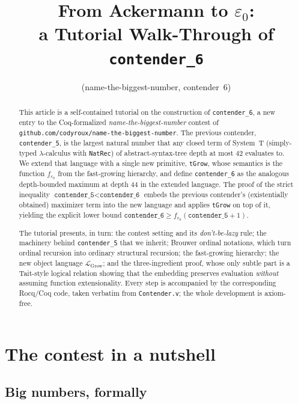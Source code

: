 \documentclass[11pt,a4paper]{article}
\title{From Ackermann to $\varepsilon_0$:\\
       a Tutorial Walk-Through of \texttt{contender\_6}}
\author{(name-the-biggest-number, contender~6)}
\date{}
\theoremstyle{plain}
\theoremstyle{definition}
\theoremstyle{remark}
\begin{document}
\maketitle
\thispagestyle{empty}

\begin{abstract}
\noindent
This article is a self-contained tutorial on the construction of
\texttt{contender\_6}, a new entry to the Coq-formalized
\emph{name-the-biggest-number} contest of
\texttt{github.com/codyroux/name-the-biggest-number}.  The previous
contender, \texttt{contender\_5}, is the largest natural number that any
closed term of System~T (simply-typed $\lambda$-calculus with
\texttt{NatRec}) of abstract-syntax-tree depth at most $42$ evaluates to.
We extend that language with a single new primitive, \texttt{tGrow},
whose semantics is the function $f_{\varepsilon_0}$ from the fast-growing
hierarchy, and define \texttt{contender\_6} as the analogous depth-bounded
maximum at depth $44$ in the extended language.  The proof of the strict
inequality $\texttt{contender\_5} < \texttt{contender\_6}$ embeds the
previous contender's (existentially obtained) maximizer term into the
new language and applies \texttt{tGrow} on top of it, yielding the
explicit lower bound
$\texttt{contender\_6} \geq f_{\varepsilon_0}(\texttt{contender\_5}+1)$.

The tutorial presents, in turn: the contest setting and its
\emph{don't-be-lazy} rule; the machinery behind \texttt{contender\_5}
that we inherit; Brouwer ordinal notations, which turn ordinal
recursion into ordinary structural recursion; the fast-growing
hierarchy; the new object language $\mathcal{L}_{\textrm{Grow}}$; and
the three-ingredient proof, whose only subtle part is a Tait-style
logical relation showing that the embedding preserves evaluation
\emph{without} assuming function extensionality.  Every step is
accompanied by the corresponding Rocq/Coq code, taken verbatim from
\texttt{Contender.v}; the whole development is axiom-free.
\end{abstract}

\tableofcontents
\newpage

\section{The contest in a nutshell}

\subsection{Big numbers, formally}
\end{document}
